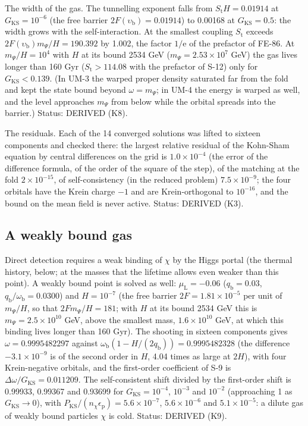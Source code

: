 \documentclass[
  10pt,
]{article}
\begin{document}
The width of the gas. The tunnelling exponent falls from
\(S_{\mathrm{t}}H = 0.01914\) at \(G_{\mathrm{KS}} = 10^{-6}\) (the free
barrier \(2F(\upsilon_{\mathrm{b}}) = 0.01914\)) to 0.00168 at
\(G_{\mathrm{KS}} = 0.5\): the width grows with the self-interaction. At
the smallest coupling \(S_{\mathrm{t}}\) exceeds
\(2F(\upsilon_{\mathrm{b}})m_\Psi/H = 190.392\) by 1.002, the factor
\(1/\mathrm{e}\) of the prefactor of FE-86. At \(m_\Psi/H = 10^4\) with
\(H\) at its bound 2534 GeV (\(m_\Psi = 2.53\times10^7\) GeV) the gas
lives longer than 160 Gyr (\(S_{\mathrm{t}} > 114.08\) with the
prefactor of S-12) only for \(G_{\mathrm{KS}} < 0.139\). (In UM-3 the
warped proper density saturated far from the fold and kept the state
bound beyond \(\omega = m_\Psi\); in UM-4 the energy is warped as well,
and the level approaches \(m_\Psi\) from below while the orbital spreads
into the barrier.) Status: DERIVED (K8).

The residuals. Each of the 14 converged solutions was lifted to sixteen
components and checked there: the largest relative residual of the
Kohn-Sham equation by central differences on the grid is
\(1.0\times10^{-4}\) (the error of the difference formula, of the order
of the square of the step), of the matching at the fold
\(2\times10^{-15}\), of self-consistency (in the reduced problem)
\(7.5\times10^{-9}\); the four orbitals have the Krein charge \(-1\) and
are Krein-orthogonal to \(10^{-16}\), and the bound on the mean field is
never active. Status: DERIVED (K3).

\hypertarget{a-weakly-bound-gas}{%
\subsection{A weakly bound gas}\label{a-weakly-bound-gas}}

Direct detection requires a weak binding of \(\chi\) by the Higgs portal
(the thermal history, below; at the masses that the lifetime allows even
weaker than this point). A weakly bound point is solved as well:
\(\mu_{\mathrm{L}} = -0.06\) (\(q_{\mathrm{b}} = 0.03\),
\(q_{\mathrm{b}}/\omega_{\mathrm{b}} = 0.0300\)) and \(H = 10^{-7}\)
(the free barrier \(2F = 1.81\times10^{-5}\) per unit of \(m_\Psi/H\),
so that \(2Fm_\Psi/H = 181\); with \(H\) at its bound 2534 GeV this is
\(m_\Psi = 2.5\times10^{10}\) GeV, above the smallest mass,
\(1.6\times10^{10}\) GeV, at which this binding lives longer than 160
Gyr). The shooting in sixteen components gives \(\omega = 0.9995482297\)
against \(\omega_{\mathrm{b}}(1 - H/(2q_{\mathrm{b}})) = 0.9995482328\)
(the difference \(-3.1\times10^{-9}\) is of the second order in \(H\),
4.04 times as large at \(2H\)), with four Krein-negative orbitals, and
the first-order coefficient of S-9 is
\(\Delta\omega/G_{\mathrm{KS}} = 0.011209\). The self-consistent shift
divided by the first-order shift is 0.99933, 0.99367 and 0.93699 for
\(G_{\mathrm{KS}} = 10^{-4}\), \(10^{-3}\) and \(10^{-2}\) (approaching
1 as \(G_{\mathrm{KS}} \to 0\)), with
\(P_{\mathrm{KS}}/(n_\chi\epsilon_{\mathrm{p}}) = 5.6\times10^{-7}\),
\(5.6\times10^{-6}\) and \(5.1\times10^{-5}\): a dilute gas of weakly
bound particles \(\chi\) is cold. Status: DERIVED (K9).
\end{document}
